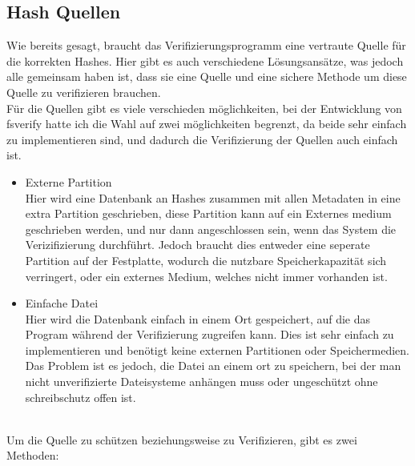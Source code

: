 \subsection{Hash Quellen}
Wie bereits gesagt, braucht das Verifizierungsprogramm eine vertraute Quelle für die korrekten Hashes.
Hier gibt es auch verschiedene Lösungsansätze, was jedoch alle gemeinsam haben ist, dass sie eine Quelle und eine sichere Methode um diese Quelle zu verifizieren brauchen.
\\
Für die Quellen gibt es viele verschieden möglichkeiten, bei der Entwicklung von fsverify hatte ich die Wahl auf zwei möglichkeiten begrenzt, da beide sehr einfach zu implementieren sind, und dadurch die Verifizierung der Quellen auch einfach ist.
\begin{itemize}
\item Externe Partition\\
  Hier wird eine Datenbank an Hashes zusammen mit allen Metadaten in eine extra Partition geschrieben, diese Partition kann auf ein Externes medium geschrieben werden, und nur dann angeschlossen sein, wenn das System die Verizifizierung durchführt.
  Jedoch braucht dies entweder eine seperate Partition auf der Festplatte, wodurch die nutzbare Speicherkapazität sich verringert, oder ein externes Medium, welches nicht immer vorhanden ist.
\item Einfache Datei\\
  Hier wird die Datenbank einfach in einem Ort gespeichert, auf die das Program während der Verifizierung zugreifen kann. Dies ist sehr einfach zu implementieren und benötigt keine externen Partitionen oder Speichermedien. Das Problem ist es jedoch, die Datei an einem ort zu speichern, bei der man nicht unverifizierte Dateisysteme anhängen muss oder ungeschützt ohne schreibschutz offen ist.
\end{itemize}
\\
Um die Quelle zu schützen beziehungsweise zu Verifizieren, gibt es zwei Methoden:
